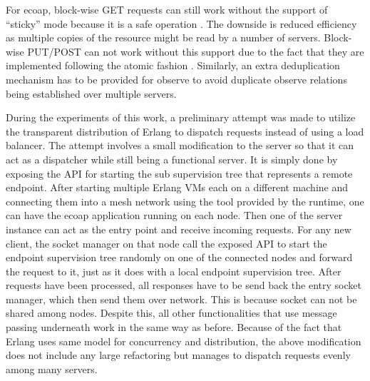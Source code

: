 For ecoap, block-wise GET requests can still work without the support of ``sticky'' mode because it is a safe operation \autocite{coap_protocol}. The downside is reduced efficiency as multiple copies of the resource might be read by a number of servers. Block-wise PUT/POST can not work without this support due to the fact that they are implemented following the atomic fashion \autocite{blockwise}. Similarly, an extra deduplication mechanism has to be provided for observe to avoid duplicate observe relations being established over multiple servers. 

During the experiments of this work, a preliminary attempt was made to utilize the transparent distribution of Erlang to dispatch requests instead of using a load balancer. The attempt involves a small modification to the server so that it can act as a dispatcher while still being a functional server. It is simply done by exposing the API for starting the sub supervision tree that represents a remote endpoint. After starting multiple Erlang VMs each on a different machine and connecting them into a mesh network using the tool provided by the runtime, one can have the ecoap application running on each node. Then one of the server instance can act as the entry point and receive incoming requests. For any new client, the socket manager on that node call the exposed API to start the endpoint supervision tree randomly on one of the connected nodes and forward the request to it, just as it does with a local endpoint supervision tree. After requests have been processed, all responses have to be send back the entry socket manager, which then send them over network. This is because socket can not be shared among nodes. Despite this, all other functionalities that use message passing underneath work in the same way as before. Because of the fact that Erlang uses same model for concurrency and distribution,
the above modification does not include any large refactoring but manages to dispatch requests evenly among many servers.

